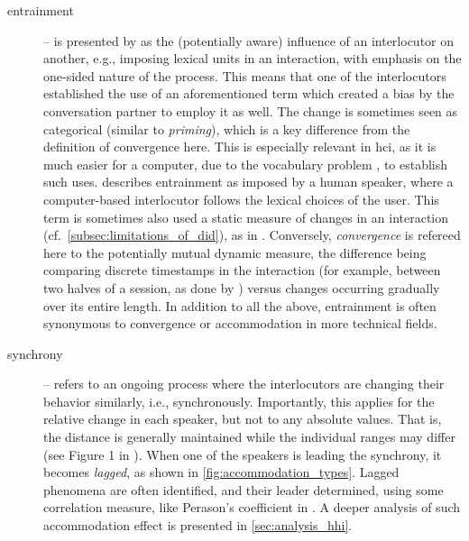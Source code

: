 \begin{description}
	\item[entrainment] -- is presented by \citet{Brennan1996lexical} as the (potentially aware) influence of an interlocutor on another, e.g., imposing lexical units in an interaction, with emphasis on the one-sided nature of the process.
	This means that one of the interlocutors established the use of an aforementioned term which created a bias by the conversation partner to employ it as well.
	The change is sometimes seen as categorical (similar to \textit{priming}), which is a key difference from the definition of convergence here.
	This is especially relevant in \ac{hci}, as it is much easier for a computer, due to the vocabulary problem \citep{Furnas1987vocabulary}, to establish such uses.
	\citet{Lopes2013automated} describes entrainment as imposed by a human speaker, where a computer-based interlocutor follows the lexical choices of the user.
	This term is sometimes also used a static measure of changes in an interaction (cf.\ \cref{subsec:limitations_of_did}), as in \citet{Levitan2013entrainment}.
	Conversely, \emph{convergence} is refereed here to the potentially mutual dynamic measure, the difference being comparing discrete timestamps in the interaction (for example, between two halves of a session, as done by \citet{Xia2014prosodic}) versus changes occurring gradually over its entire length.
	In addition to all the above, entrainment is often synonymous to convergence or accommodation in more technical fields.
	
	\item[synchrony] -- refers to an ongoing process where the interlocutors are changing their behavior similarly, i.e., synchronously.
	Importantly, this applies for the relative change in each speaker, but not to any absolute values.
	That is, the distance is generally maintained while the individual ranges may differ (see Figure 1 in \citet{Levitan2011measuring}).
	When one of the speakers is leading the synchrony, it becomes \emph{lagged}, as shown in \cref{fig:accommodation_types}.
	Lagged phenomena are often identified, and their leader determined, using some correlation measure, like Perason's coefficient in \citet{Edlund2009pause, Xia2014prosodic}.
	A deeper analysis of such accommodation effect is presented in \cref{sec:analysis_hhi}.
	

\end{description}
